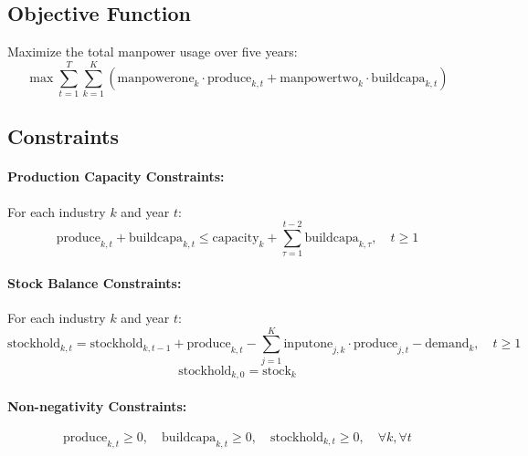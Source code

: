 \documentclass{article}
\begin{document}
\subsection*{Objective Function}
Maximize the total manpower usage over five years:
\[
\max \sum_{t=1}^{T} \sum_{k=1}^{K} (\text{manpowerone}_{k} \cdot \text{produce}_{k,t} + \text{manpowertwo}_{k} \cdot \text{buildcapa}_{k,t})
\]

\subsection*{Constraints}

\paragraph{Production Capacity Constraints:}
For each industry \(k\) and year \(t\):
\[
\text{produce}_{k,t} + \text{buildcapa}_{k,t} \leq \text{capacity}_{k} + \sum_{\tau=1}^{t-2} \text{buildcapa}_{k,\tau}, \quad t \geq 1
\]

\paragraph{Stock Balance Constraints:}
For each industry \(k\) and year \(t\):
\[
\text{stockhold}_{k,t} = \text{stockhold}_{k,t-1} + \text{produce}_{k,t} - \sum_{j=1}^{K} \text{inputone}_{j,k} \cdot \text{produce}_{j,t} - \text{demand}_{k}, \quad t \geq 1
\]
\[
\text{stockhold}_{k,0} = \text{stock}_{k}
\]

\paragraph{Non-negativity Constraints:}
\[
\text{produce}_{k,t} \geq 0, \quad \text{buildcapa}_{k,t} \geq 0, \quad \text{stockhold}_{k,t} \geq 0, \quad \forall k, \forall t
\]
\end{document}
